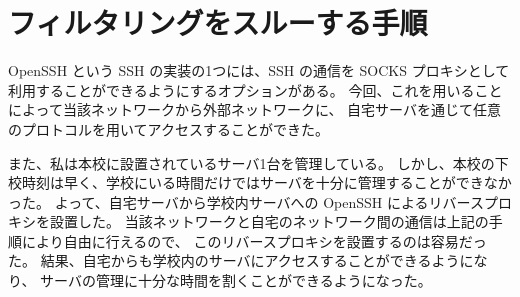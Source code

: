 \documentclass{jsarticle}
\begin{document}
\section{フィルタリングをスルーする手順}
OpenSSH という SSH の実装の1つには、SSH の通信を SOCKS プロキシとして利用することができるようにするオプションがある。
今回、これを用いることによって当該ネットワークから外部ネットワークに、
自宅サーバを通じて任意のプロトコルを用いてアクセスすることができた。

また、私は本校に設置されているサーバ1台を管理している。
しかし、本校の下校時刻は早く、学校にいる時間だけではサーバを十分に管理することができなかった。
よって、自宅サーバから学校内サーバへの OpenSSH によるリバースプロキシを設置した。
当該ネットワークと自宅のネットワーク間の通信は上記の手順により自由に行えるので、
このリバースプロキシを設置するのは容易だった。
結果、自宅からも学校内のサーバにアクセスすることができるようになり、
サーバの管理に十分な時間を割くことができるようになった。
\end{document}
